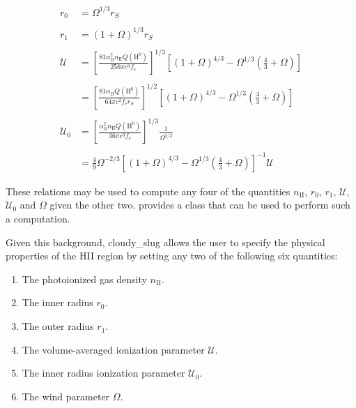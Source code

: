 \documentclass[letterpaper,10pt,english]{sphinxmanual}
\begin{document}
\begin{align*}\!\begin{aligned}
r_0 & = \Omega^{1/3} r_S \\\\
r_1 & = \left(1 + \Omega\right)^{1/3} r_S \\\\
\mathcal{U} & = \left[\frac{81 \alpha_B^2 n_{\mathrm{II}}
Q(\mathrm{H}^0)}{256 \pi c^3 f_e}\right]^{1/3}
\left[\left(1 + \Omega\right)^{4/3}
- \Omega^{1/3} \left(\frac{4}{3}+\Omega\right)\right] \\\\
& = \left[\frac{81 \alpha_B Q(\mathrm{H}^0)}
{64 \pi c^2 f_e r_S}\right]^{1/2}
\left[\left(1 + \Omega\right)^{4/3}
- \Omega^{1/3} \left(\frac{4}{3}+\Omega\right)\right] \\\\
\mathcal{U}_0 &= \left[
\frac{\alpha_B^2 n_{\mathrm{II}} Q(\mathrm{H}^0)}
{36 \pi c^3 f_e}\right]^{1/3} \frac{1}{\Omega^{2/3}} \\\\
&= \frac{4}{9}\Omega^{-2/3} \left[(1+\Omega)^{4/3} -
\Omega^{1/3}\left(\frac{4}{3}+\Omega\right)\right]^{-1}
\mathcal{U} \\\\
\end{aligned}\end{align*}
These relations may be used to compute any four of the quantities
\(n_{\mathrm{II}}\), \(r_0\), \(r_1\), \(\mathcal{U}\),
\(\mathcal{U}_0\) and \(\Omega\) given the other two.
{\hyperref[\detokenize{slugpy:sec-slugpy}]{}} provides a class  that can be used
to perform such a computation.

Given this background, cloudy\_slug allows the user to specify the
physical properties of the HII region by setting any two of the
following six quantities:
\begin{enumerate}
\item {} 
The photoionized gas density \(n_{\mathrm{II}}\).

\item {} 
The inner radius \(r_0\).

\item {} 
The outer radius \(r_1\).

\item {} 
The volume-averaged ionization parameter \(\mathcal{U}\).

\item {} 
The inner radius ionization parameter \(\mathcal{U}_0\).

\item {} 
The wind parameter \(\Omega\).

\end{enumerate}
\end{document}
